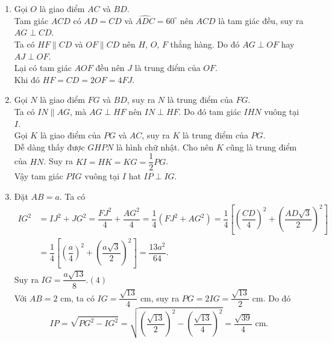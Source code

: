 \begin{bt}
{\begin{enumerate}
   Mặt khác $AC \perp BD$ nên $EF \perp FG$ hay $\widehat{EFG}=90^\circ$.\hfill$(2)$\\
   Từ $(1)$ và $(2)$ suy ra $EFGH$ là hình chữ nhật.
   \item Gọi $O$ là giao điểm $AC$ và $BD$.\\
   Tam giác $ACD$ có $AD=CD$ và $\widehat{ADC}=60^\circ$ nên $ACD$ là tam giác đều, suy ra $AG \perp CD$.\\
   Ta có $HF \parallel CD$ và $OF \parallel CD$ nên $H$, $O$, $F$ thẳng hàng. Do đó $AG \perp OF$ hay $AJ \perp OF$.\\
   Lại có tam giác $AOF$ đều nên $J$ là trung điểm của $OF$.\\
   Khi đó $HF = CD = 2OF = 4FJ$.
   \item Gọi $N$ là giao điểm $FG$ và $BD$, suy ra $N$ là trung điểm của $FG$.\\
   Ta có $IN \parallel AG$, mà $AG \perp HF$ nên $IN \perp HF$. Do đó tam giác $IHN$ vuông tại $I$.\\
   Gọi $K$ là giao điểm của $PG$ và $AC$, suy ra $K$ là trung điểm của $PG$.\\
   Dễ dàng thấy được $GHPN$ là hình chữ nhật. Cho nên $K$ cũng là trung điểm của $HN$. Suy ra $KI=HK=KG = \dfrac{1}{2}PG$.\\
   Vậy tam giác $PIG$ vuông tại $I$ hat $IP \perp IG$.
   \item Đặt $AB=a$. Ta có
   \begin{align*}
   IG^2 &= IJ^2+JG^2 = \dfrac{FJ^2}{4}+\dfrac{AG^2}{4} = \dfrac{1}{4}\left(FJ^2+AG^2\right) = \dfrac{1}{4}\left[\left(\dfrac{CD}{4}\right)^2+\left(\dfrac{AD\sqrt{3}}{2}\right)^2\right]\\
   &= \dfrac{1}{4}\left[\left(\dfrac{a}{4}\right)^2+\left(\dfrac{a\sqrt{3}}{2}\right)^2\right] = \dfrac{13a^2}{64}.
   \end{align*}
   Suy ra $IG=\dfrac{a\sqrt{13}}{8}$.\hfill$(4)$\\
   Với $AB=2$ cm, ta có $IG=\dfrac{\sqrt{13}}{4}$ cm, suy ra $PG=2IG=\dfrac{\sqrt{13}}{2}$ cm. Do đó
   $$IP = \sqrt{PG^2 - IG^2} = \sqrt{\left(\dfrac{\sqrt{13}}{2}\right)^2 - \left(\dfrac{\sqrt{13}}{4}\right)^2} = \dfrac{\sqrt{39}}{4} \text{ cm}.$$
  \end{enumerate}
  }
\end{bt}

